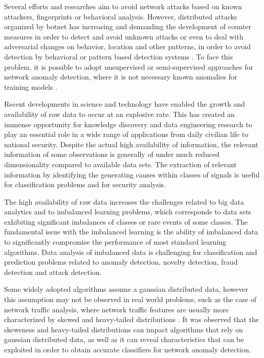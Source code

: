 Several efforts and researches aim to avoid network attacks based on known attackers, fingerprints or behavioral analysis. However, distributed attacks organized by botnet has increasing and demanding the development of counter measures in order to detect and avoid unknown attacks or even to deal with adversarial changes on behavior, location and other patterns, in order to avoid detection by behavioral or pattern based detection systems \cite{gu2008botminer, garcia2014empirical,khattak2015botflex,acarali2016survey,wang2017botnet,Wang2018ddosbotnetssurvey}. To face this problem, it is possible to adopt unsupervised or semi-supervised approaches for network anomaly detection, where it is not necessary known anomalies for training models \cite{moustafa2019holistic}.

Recent developments in science and technology have enabled the growth and availability of raw data to occur at an explosive rate. This has created an immense opportunity for knowledge discovery and data engineering research to play an essential role in a wide range of applications from daily civilian life to national security. Despite the actual high availability of information, the relevant information of some observations is generally of under much reduced dimensionality compared to available data sets. The extraction of relevant information by identifying the generating causes within classes of signals is useful for classification problems and for security analysis. 

The high availability of raw data increases the challenges related to big data analytics and to imbalanced learning problems, which corresponds to data sets exhibiting significant imbalances of classes or rare events of some classes. The fundamental issue with the imbalanced learning is the ability of imbalanced data to significantly compromise the performance of most standard learning algorithms. Data analysis of imbalanced data is challenging for classification and prediction problems related to anomaly detection, novelty detection, fraud detection and attack detection.

Some widely adopted algorithms assume a gaussian distributed data, however this assumption may not be observed in real world problems, such as the case of network traffic analysis, where network traffic features are usually more characterized by skewed and heavy-tailed distributions \cite{lakhina2005mining,benson2010network,leon2017probability}. It was observed that the skeweness and heavy-tailed distributions can impact algorithms that rely on gaussian distributed data, as well as it can reveal characteristics that can be exploited in order to obtain accurate classifiers for network anomaly detection.

